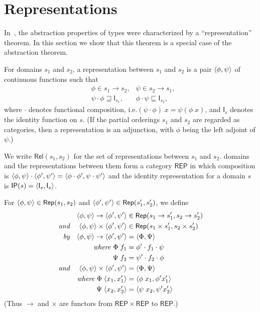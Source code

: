 \documentclass[sigplan,screen,nonacm,balance=false]{acmart}
\makeatletter
\theoremstyle{plain}
\DeclarePairedDelimiter{\pair}{\langle}{\rangle}
\newcommand{\ie}{i.e.\@\xspace}
\newcommand{\Rel}{\mathsf{Rel}}
\newcommand{\Id}{\mathsf{I}}
\newcommand{\Rep}{\mathsf{Rep}}
\newcommand{\REP}{\mathsf{REP}}
\newcommand{\IP}{\mathsf{IP}}
\makeatother
\begin{document}
\section{Representations}

In~\citep{polymorphism}, the abstraction properties of types were characterized by a ``representation'' theorem.
In this section we show that this theorem is a special case of the abstraction theorem.

For domains $s_1$ and $s_2$, a representation between $s_1$ and $s_2$ is a pair $\pair{\phi, \psi}$ of continuous functions such that
%
\begin{align*}
  & \phi \in s_1 \to s_2, & \psi \in s_2 \to s_1, \\
  & \psi \cdot \phi \sqsupseteq \Id_{s_1}, & \phi \cdot \psi \sqsubseteq \Id_{s_2},
\end{align*}
%
where $\cdot$ denotes functional composition, \ie $(\psi \cdot \phi) \; x = \psi(\phi \; x)$, and $\Id_s$ denotes the identity function on $s$.
(If the partial orderings $s_1$ and $s_2$ are regarded as categories, then a representation is an adjunction, with $\phi$ being the left adjoint of $\psi$.)

We write $\Rel(s_1, s_2)$ for the set of representations between $s_1$ and $s_2$.
domains and the representations between them form a category $\REP$ in which composition is $\pair{\phi, \psi} \cdot \pair{\phi', \psi'} = \pair{\phi \cdot \phi', \psi \cdot \psi'}$ and the identity representation for a domain $s$ is $\IP(s) = \pair{\Id_s, \Id_s}$.

For $\pair{\phi, \psi} \in \Rep(s_1, s_2)$ and $\pair{\phi', \psi'} \in \Rep(s'_1, s'_2)$, we define
%
\begin{align*}
  && \pair{\phi, \psi} \to \pair{\phi', \psi'} &\in \Rep(s_1 \to s'_1, s_2 \to s'_2) \\
  \textit{and} && \pair{\phi, \psi} \times \pair{\phi', \psi'} &\in \Rep(s_1 \times s'_1, s_2 \times s'_2) \\
  \textit{by} && \pair{\phi, \psi} \to \pair{\phi', \psi'} &= \pair{\Phi, \Psi} \\
  && \textit{where } \Phi \; f_1 &= \phi' \cdot f_1 \cdot \psi \\
  && \Psi \; f_2 &= \psi' \cdot f_2 \cdot \phi \\
  \textit{and} && \pair{\phi, \psi} \times \pair{\phi', \psi'} &= \pair{\Phi, \Psi} \\
  && \textit{where } \Phi \; \pair{x_1, x'_1} &= \pair{\phi \; x_1, \phi' x'_1} \\
  && \Psi \; \pair{x_2, x'_2} &= \pair{\psi \; x_2, \psi' x'_2}
\end{align*}
%
(Thus $\to$ and $\times$ are functors from $\REP \times \REP$ to $\REP$.)
\end{document}
